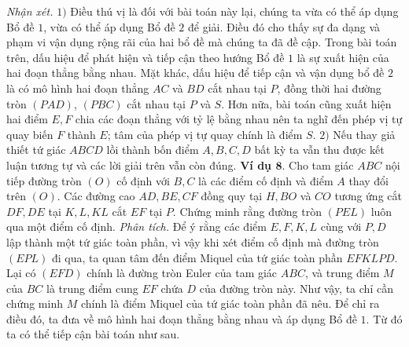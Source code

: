 \begin{multicols}{2}
\begin{figure}[H]
		\vspace*{-10pt}
	\end{figure}
	\textit{Nhận xét.} $1)$ Điều thú vị là đối với bài toán này lại, chúng ta vừa có thể áp dụng Bổ đề $1$, vừa có thể áp dụng Bổ đề $2$ để giải. Điều đó cho thấy sự đa dạng và phạm vi vận dụng rộng rãi của hai bổ đề mà chúng ta đã đề cập. Trong bài toán trên, dấu hiệu để phát hiện và tiếp cận theo hướng Bổ đề $1$  là sự xuất hiện của hai đoạn thẳng bằng nhau. Mặt khác, dấu hiệu để tiếp cận và vận dụng bổ đề $2$ là có mô hình hai đoạn thẳng $AC$ và $BD$ cắt nhau tại $P$, đồng thời hai đường tròn $(PAD)$, $(PBC)$ cắt nhau tại $P$ và $S$. Hơn nữa, bài toán cũng xuất hiện hai điểm $E,F$ chia các đoạn thẳng với tỷ lệ bằng nhau nên ta nghĩ đến phép vị tự quay biến $F$ thành $E$; tâm của phép vị tự quay chính là điểm $S$.
	\vskip 0.1cm
	$2)$ Nếu thay giả thiết tứ giác $ABCD$ lồi thành bốn điểm $A, B, C, D$ bất kỳ ta vẫn thu được kết luận tương tự và các lời giải trên vẫn còn đúng.
	\vskip 0.1cm
	\textbf{\color{diendantoanhoc}Ví dụ $\pmb{8.}$} Cho tam giác $ABC$ nội tiếp đường tròn $(O)$ cố định với $B,C$ là các điểm cố định và điểm $A$ thay đổi trên $(O)$. Các đường cao $AD,BE,CF$ đồng quy tại $H,BO$ và $CO$ tương ứng cắt $DF,DE$ tại $K,L,KL$ cắt $EF$ tại $P$. Chứng minh rằng đường tròn $(PEL)$ luôn qua một điểm cố định.
	\vskip 0.1cm
	\textit{Phân tích.} Để ý rằng các điểm $E,F,K,L$ cùng với $P,D$ lập thành một tứ giác toàn phần, vì vậy khi xét điểm cố định mà đường tròn $(EPL)$ đi qua, ta quan tâm đến điểm Miquel của tứ giác toàn phần $EFKLPD$. Lại có $(EFD)$ chính là đường tròn Euler của tam giác $ABC$, và trung điểm $M$ của $BC$ là trung điểm cung $EF$ chứa $D$ của đường tròn này. Như vậy, ta chỉ cần chứng minh $M$ chính là điểm Miquel của tứ giác toàn phần đã nêu. Để chỉ ra điều đó, ta đưa về mô hình hai đoạn thẳng bằng nhau và áp dụng Bổ đề $1$. Từ đó ta có thể tiếp cận bài toán như sau.
	\begin{figure}[H]
		\vspace*{-5pt}
		\centering
		\captionsetup{labelformat= empty, justification=centering}

\end{figure}
\end{multicols}
